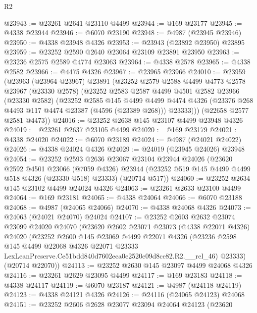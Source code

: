 \begin{lexlean}{R2}
\begin{coremodule}
@23943 := @23261 @2641 @23110 @4499
@23944 := @169 @23177
@23945 := @4338 @23944
@23946 := @6070 @23190
@23948 := @4987 (@23945 @23946)
@23950 := @4338 @23948 @4326
@23953 := @23943 (@23892 @23950) @23895
@23959 := @23252 @2590 @2640 @23064 @23109 @23891 @23950
@23963 := @23236 @2575 @2589 @4774 @23063
@23964 := @4338 @2578
@23965 := @4338 @2582
@23966 := @4475 @4326
@23967 := @23965 @23966
@24010 := @23959
    (@23963
      (@23964 @23967)
      @23891
      (@23252
        @2579
        @2588
        @4499
        @4773
        @2578
        @23967
        (@23330 @2578)
        (@23252
          @2583
          @2587
          @4499
          @4501
          @2582
          @23966
          (@23330 @2582)
          (@23252
            @2585
            @145
            @4499
            @4499
            @4474
            @4326
            (@23376 @268 @4493 @117 @4474 @23387 (@4596 (@23389 @268)))
            @23333)))
      (@22658 @2577 @2581 @4473))
@24016 := @23252 @2638 @145 @23107 @4499 @23948 @4326
@24019 := @23261 @2637 @23105 @4499
@24020 := @169 @23179
@24021 := @4338 @24020
@24022 := @6070 @23189
@24024 := @4987 (@24021 @24022)
@24026 := @4338 @24024 @4326
@24029 := @24019 (@23945 @24026) @23948
@24054 := @23252
    @2593
    @2636
    @23067
    @23104
    @23944
    @24026
    (@23620
      @2592
      @4501
      @23066
      (@7059 @4326)
      @23944
      (@23252 @519 @145 @4499 @4499 @518 @4326 (@23330 @518) @23333)
      (@20714 @517))
@24060 := @23252 @2634 @145 @23102 @4499 @24024 @4326
@24063 := @23261 @2633 @23100 @4499
@24064 := @169 @23181
@24065 := @4338 @24064
@24066 := @6070 @23188
@24068 := @4987 (@24065 @24066)
@24070 := @4338 @24068 @4326
@24073 := @24063 (@24021 @24070) @24024
@24107 := @23252
    @2603
    @2632
    @23074
    @23099
    @24020
    @24070
    (@23620
      @2602
      @23071
      @23073
      (@4338 @22071 @4326)
      @24020
      (@23252
        @2600
        @145
        @23069
        @4499
        @22071
        @4326
        (@23236
          @2598
          @145
          @4499
          @22068
          @4326
          @22071
          @23333
          LexLeanPreserve.Ce51bdd840d7602eca0e2520e09d8ce82.R2.__rel_46)
        @23333)
      (@20714 @22070))
@24113 := @23252 @2630 @145 @23097 @4499 @24068 @4326
@24116 := @23261 @2629 @23095 @4499
@24117 := @169 @23183
@24118 := @4338 @24117
@24119 := @6070 @23187
@24121 := @4987 (@24118 @24119)
@24123 := @4338 @24121 @4326
@24126 := @24116 (@24065 @24123) @24068
@24151 := @23252
    @2606
    @2628
    @23077
    @23094
    @24064
    @24123
    (@23620

\end{coremodule}
\end{lexlean}
